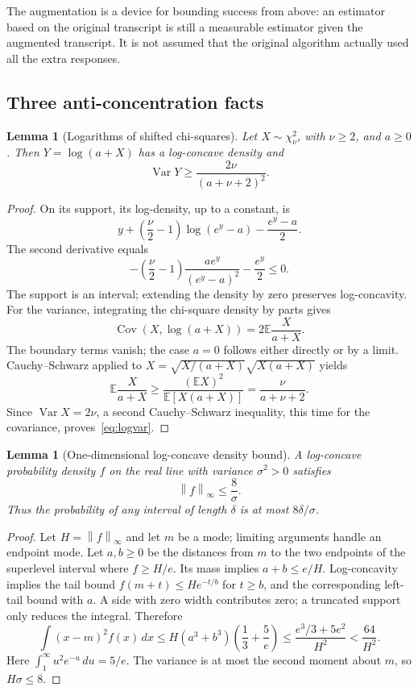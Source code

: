 \documentclass[11pt]{article}
\newtheorem{lemma}[theorem]{Lemma}
\theoremstyle{definition}\newtheorem{definition}[theorem]{Definition}
\theoremstyle{remark}\newtheorem{remark}[theorem]{Remark}
\newcommand{\E}{\mathbb E}\newcommand{\PP}{\mathbb P}
\newcommand{\Var}{\operatorname{Var}}\newcommand{\Cov}{\operatorname{Cov}}
\newcommand{\norm}[1]{\left\lVert#1\right\rVert}
\begin{document}
The augmentation is a device for bounding success from above: an estimator
based on the original transcript is still a measurable estimator given the
augmented transcript. It is not assumed that the original algorithm actually
used all the extra responses.

\subsection{Three anti-concentration facts}

\begin{lemma}[Logarithms of shifted chi-squares]\label{lem:loggamma}
Let $X\sim\chi^2_\nu$, with $\nu\ge2$, and $a\ge0$. Then $Y=\log(a+X)$ has a
log-concave density and
\begin{equation}\label{eq:logvar}
 \Var Y\ge\frac{2\nu}{(a+\nu+2)^2}.
\end{equation}
\end{lemma}
\begin{proof}
On its support, its log-density, up to a constant, is
\[
 y+\left(\frac\nu2-1\right)\log(e^y-a)-\frac{e^y-a}{2}.
\]
The second derivative equals
\[
 -\left(\frac\nu2-1\right)\frac{a e^y}{(e^y-a)^2}-\frac{e^y}{2}\le0.
\]
The support is an interval; extending the density by zero preserves
log-concavity.
For the variance, integrating the chi-square density by parts gives
\[
 \Cov(X,\log(a+X))=2\E\frac X{a+X}.
\]
The boundary terms vanish; the case $a=0$ follows either directly or by a limit.
Cauchy--Schwarz applied to
$X=\sqrt{X/(a+X)}\sqrt{X(a+X)}$ yields
\[
 \E\frac X{a+X}\ge
 \frac{(\E X)^2}{\E[X(a+X)]}
 =\frac\nu{a+\nu+2}.
\]
Since $\Var X=2\nu$, a second Cauchy--Schwarz inequality, this time for the
covariance, proves~\eqref{eq:logvar}.
\end{proof}

\begin{lemma}[One-dimensional log-concave density bound]\label{lem:lc}
A log-concave probability density $f$ on the real line with variance
$\sigma^2>0$ satisfies
\[
 \norm f_\infty\le\frac8\sigma.
\]
Thus the probability of any interval of length $\delta$ is at most
$8\delta/\sigma$.
\end{lemma}
\begin{proof}
Let $H=\norm f_\infty$ and let $m$ be a mode; limiting arguments handle an
endpoint mode. Let $a,b\ge0$ be the distances from $m$ to the two endpoints of
the superlevel interval where $f\ge H/e$. Its mass implies
$a+b\le e/H$. Log-concavity implies the tail bound
$f(m+t)\le H e^{-t/b}$ for $t\ge b$, and the corresponding left-tail bound
with $a$. A side with zero width contributes zero; a truncated support only
reduces the integral. Therefore
\[
 \int (x-m)^2 f(x)\,dx
 \le H(a^3+b^3)\left(\frac13+\frac5e\right)
 \le\frac{e^3/3+5e^2}{H^2}<\frac{64}{H^2}.
\]
Here $\int_1^\infty u^2e^{-u}\,du=5/e$. The variance is at most the second
moment about $m$, so $H\sigma\le8$.
\end{proof}
\end{document}
